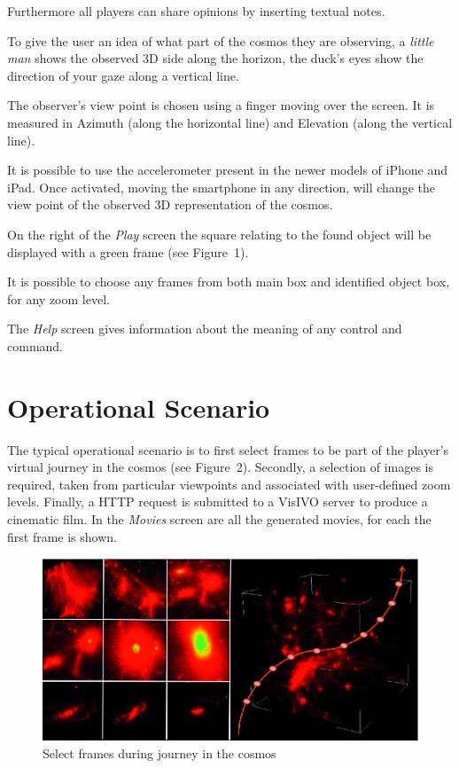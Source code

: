 Furthermore all players can share opinions by inserting textual notes.

To give the user an idea of what part of the cosmos they are observing, a \emph{little man} shows the observed  3D side along the horizon,  the duck's eyes show the direction of your gaze along a vertical line.

The observer's view point  is chosen using a finger moving over the screen. It is measured in Azimuth (along the horizontal line) and Elevation (along the vertical line).

It is possible to use the accelerometer present in the newer models of iPhone and iPad. Once activated, moving the smartphone in any direction, will change the view point of the observed 3D representation of the cosmos.

On the right of the \emph{Play} screen the square relating to the found object will be displayed with a 
green frame (see Figure~1).

It is possible to choose any frames from both main box and identified object box, for  any zoom level.

The \emph{Help} screen gives information about the meaning of any control and command.

\section{Operational Scenario}
The typical operational scenario is to first select frames to be part of the player's virtual journey in the cosmos (see Figure~2). Secondly, a selection of images is required, taken from particular viewpoints and associated with user-defined zoom levels. Finally, a HTTP request is submitted to a VisIVO server to produce a cinematic film. In the \emph{Movies} screen are all the generated movies, for each the first frame is shown.
\begin{figure}[h]
\centering
\includegraphics[scale=0.9]{part5/Massimino_O24/P024_f2}
\caption{Select frames during journey in the cosmos}
\end{figure}

